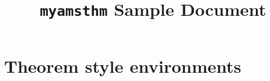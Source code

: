 \documentclass{article}
\begin{document}
\title{\texttt{myamsthm} Sample Document}
\author{}
\date{}

\maketitle

\begin{verbatim*}
\usepackage{myamsthm}
\end{verbatim*}

\section{Theorem style environments}

\begin{conjecture}\leavevmode
\begin{verbatim*}
\begin{conjecture}
\end{conjecture}
\end{verbatim*}
\end{conjecture}

\begin{conjecture*}\leavevmode
\begin{verbatim*}
\begin{conjecture*}
\end{conjecture*}
\end{verbatim*}
\end{conjecture*}

\begin{corollary}\leavevmode
\begin{verbatim*}
\begin{corollary}
\end{corollary}
\end{verbatim*}
\end{corollary}

\begin{corollary*}\leavevmode
\begin{verbatim*}
\begin{corollary*}
\end{corollary*}
\end{verbatim*}
\end{corollary*}

\begin{lemma}\leavevmode
\begin{verbatim*}
\begin{lemma}
\end{lemma}
\end{verbatim*}
\end{lemma}
\end{document}
